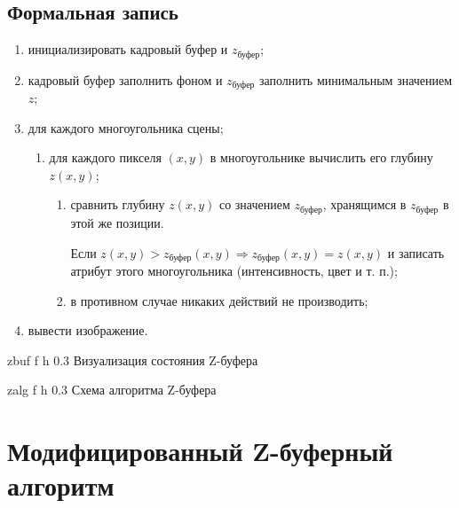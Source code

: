 \subsection{Формальная запись}
\begin{enumerate}
	\item инициализировать кадровый буфер и $z_{\text{буфер}}$;
	\item кадровый буфер заполнить фоном и $z_{\text{буфер}}$ заполнить  минимальным значением $z$;
	\item для каждого многоугольника сцены;
	\begin{enumerate}[label=\arabic{enumi}.\arabic*]
		\item  для каждого пикселя $(x, y)$ в многоугольнике вычислить его глубину $z(x, y)$;
		\begin{enumerate}
			\item  сравнить глубину $z(x, y)$ со значением  $z_{\text{буфер}}$, хранящимся в $z_{\text{буфер}}$ в этой же позиции. 
			
			Если  $z(x, y) > z_{\text{буфер}}(x, y) \Rightarrow z_{\text{буфер}}(x, y) = z(x, y) $ и записать атрибут этого многоугольника (интенсивность, цвет и т. п.);
			
			\item в противном случае никаких действий не производить;
		\end{enumerate}
	\end{enumerate}
	
	\item вывести изображение.
\end{enumerate}


{zbuf} %
{f} %
{h} %
{0.3\textwidth} %
{Визуализация состояния Z-буфера} %


\clearpage


{zalg} %
{f} %
{h} %
{0.3\textwidth} %
{Схема алгоритма Z-буфера} %


\clearpage



\section{Модифицированный Z-буферный алгоритм}

